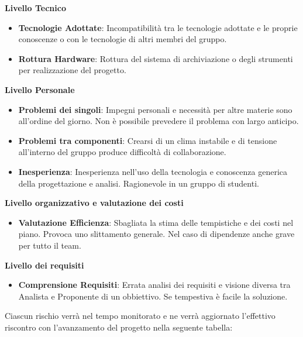 \documentclass[12pt,a4paper,titlepage]{article}
\begin{document}
	\begin{center}
		\textbf{Livello Tecnico}
	\end{center}
	\begin{itemize}
		\item \textbf{Tecnologie Adottate}: Incompatibilità tra le tecnologie adottate e le proprie conoscenze o con le tecnologie di altri membri del gruppo.
		\item \textbf{Rottura Hardware}: Rottura del sistema di archiviazione o degli strumenti per realizzazione del progetto.	
	\end{itemize}
	\begin{center}
		\textbf{Livello Personale}
	\end{center}
	\begin{itemize}
		\item \textbf{Problemi dei singoli}: Impegni personali e necessità per altre materie sono all'ordine del giorno. Non è possibile prevedere il problema con largo anticipo.
		\item \textbf{Problemi tra componenti}: Crearsi di un clima instabile e di tensione all'interno del gruppo produce difficoltà di collaborazione. 
		\item \textbf{Inesperienza}: Inesperienza nell'uso della tecnologia e conoscenza generica della progettazione e analisi. Ragionevole in un gruppo di studenti. 
	\end{itemize}
	\begin{center}
		\textbf{Livello organizzativo e valutazione dei costi}
	\end{center}
	\begin{itemize}
		\item \textbf{Valutazione Efficienza}: Sbagliata la stima delle tempistiche e dei costi nel piano. Provoca uno slittamento generale. Nel caso di dipendenze anche grave per tutto il team.  
	\end{itemize}
	\begin{center}
		\textbf{Livello dei requisiti}
	\end{center}
	\begin{itemize}
		\item \textbf{Comprensione Requisiti}: Errata analisi dei requisiti e visione diversa tra Analista e Proponente di un obbiettivo. Se tempestiva è facile la soluzione.
	\end{itemize}
	
	Ciascun rischio verrà nel tempo monitorato e ne verrà aggiornato l'effettivo riscontro con l'avanzamento del progetto nella seguente tabella:
	
\end{document}
